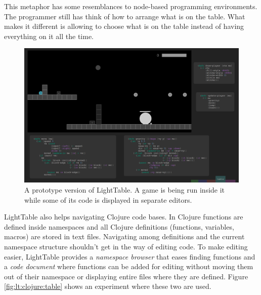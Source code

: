 \documentclass{./llncs2e/llncs}
\begin{document}
	This metaphor has some resemblances to node-based programming environments. 
	The programmer still has think of how to arrange what is on the table.
	What makes it different is allowing to choose what is on the table instead of having everything on it all the time.

	\begin{figure}
	  \centering
	  \includegraphics[width=1.0\textwidth]{img/lt_game_example}
	    \caption{A prototype version of LightTable. A game is being run inside it while some of its code is displayed in separate editors.}
	  \label{fig:lt:draft:table}
	\end{figure} 

	LightTable also helps navigating Clojure code bases.
	In Clojure functions are defined inside namespaces and all Clojure definitions (functions, variables, macros) are stored in text files. 
	Navigating among definitions and the current namespace structure shouldn't get in the way of editing code. 
	To make editing easier, LightTable provides a \emph{namespace browser} that eases finding functions and a \emph{code document} where functions can be added for editing without moving them out of their namespace or displaying entire files where they are defined. 
	Figure \ref{fig:lt:clojure:table} shows an experiment where these two are used.
\end{document}
